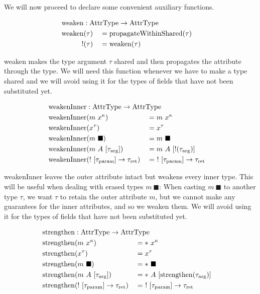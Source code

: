 We will now proceed to declare some convenient auxiliary functions. 

\newcommand{\weaken}{\mathrm{weaken}}

\begin{alignat*}{3}
  \weaken &: \mathrlap{\AttrType \to \AttrType} \\
  \weaken&(\tau) &&= \propagateWithinShared(\tau) \\
  !&(\tau) &&= \weaken(\tau)
\end{alignat*}

weaken makes the type argument $\tau$ shared and then propagates the attribute through the type. We will need this function whenever we have to make a type shared and we will avoid using it for the types of fields that have not been substituted yet.

\newcommand{\weakenInner}{\mathrm{weakenInner}}

\begin{alignat*}{3}
	\weakenInner &: \mathrlap{\AttrType \to \AttrType} \\
	\weakenInner&(m\ x^\kappa) &&= m\ x^\kappa \\
	\weakenInner&(x^\tau) &&= x^\tau \\
	\weakenInner&(m\ \blacksquare) &&= m\ \blacksquare \\
	\weakenInner&(m\ A\ [\tau_\arrg]) &&= m\ A\ [!(\tau_\arrg)] \\
	\weakenInner&(!\ [\tau_\param] \to \tau_\ret) &&=\ !\ [\tau_\param] \to \tau_\ret \\
\end{alignat*}

weakenInner leaves the outer attribute intact but weakens every inner type. This will be useful when dealing with erased types $m\ \blacksquare$: When casting $m\ \blacksquare$ to another type $\tau$, we want $\tau$ to retain the outer attribute $m$, but we cannot make any guarantees for the inner attributes, and so we weaken them. We will avoid using it for the types of fields that have not been substituted yet.

\newcommand{\strengthen}{\mathrm{strengthen}}

\begin{alignat*}{3}
  \strengthen &: \mathrlap{\AttrType \to \AttrType} \\
  \strengthen&(m\ x^\kappa) &&= *\ x^\kappa \\
  \strengthen&(x^\tau) &&= x^\tau \\
  \strengthen&(m\ \blacksquare) &&= *\ \blacksquare \\
  \strengthen&(m\ A\ [\tau_\arrg]) &&= *\ A\ [\strengthen(\tau_\arrg)] \\
  \strengthen&(!\ [\tau_\param] \to \tau_\ret) &&=\ !\ [\tau_\param] \to \tau_\ret \\
\end{alignat*}

